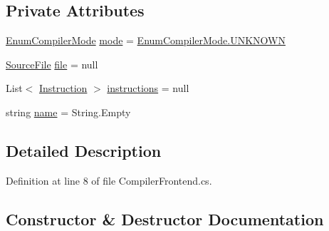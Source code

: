 \subsection*{Private Attributes}
\begin{DoxyCompactItemize}
\item 
\hyperlink{namespace_c_p_u___o_s___simulator_1_1_compiler_ada8d93b571fa15a0f2eac8c9647a89fe}{Enum\+Compiler\+Mode} \hyperlink{class_c_p_u___o_s___simulator_1_1_compiler_1_1_compiler_frontend_aa02bf709b3e3b19e45f89c8c2864afb4}{mode} = \hyperlink{namespace_c_p_u___o_s___simulator_1_1_compiler_ada8d93b571fa15a0f2eac8c9647a89fea696b031073e74bf2cb98e5ef201d4aa3}{Enum\+Compiler\+Mode.\+U\+N\+K\+N\+O\+W\+N}
\item 
\hyperlink{class_c_p_u___o_s___simulator_1_1_compiler_1_1_source_file}{Source\+File} \hyperlink{class_c_p_u___o_s___simulator_1_1_compiler_1_1_compiler_frontend_a57d54910e0df9189cf333b95d9123641}{file} = null
\item 
List$<$ \hyperlink{class_c_p_u___o_s___simulator_1_1_c_p_u_1_1_instruction}{Instruction} $>$ \hyperlink{class_c_p_u___o_s___simulator_1_1_compiler_1_1_compiler_frontend_aec71846f593e4bdcbd7d63a49b3b25bd}{instructions} = null
\item 
string \hyperlink{class_c_p_u___o_s___simulator_1_1_compiler_1_1_compiler_frontend_a2b4facf897341f61d4db60dc7fdc67c4}{name} = String.\+Empty
\end{DoxyCompactItemize}


\subsection{Detailed Description}


Definition at line 8 of file Compiler\+Frontend.\+cs.



\subsection{Constructor \& Destructor Documentation}
\hypertarget{class_c_p_u___o_s___simulator_1_1_compiler_1_1_compiler_frontend_ac3122a57986de8d3bfb16a78af8e49a1}{}
